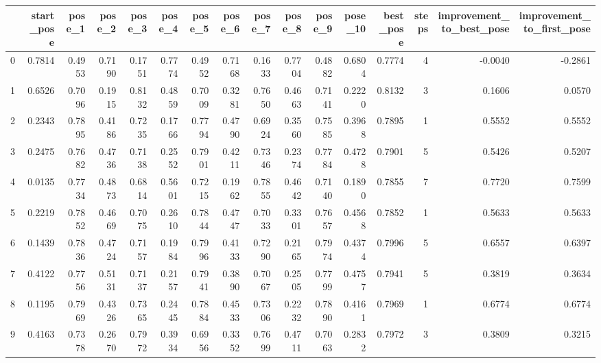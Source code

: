 \begin{tabular}{lrrrrrrrrrrrrrrr}
\toprule
{} &  start\_pose &  pose\_1 &  pose\_2 &  pose\_3 &  pose\_4 &  pose\_5 &  pose\_6 &  pose\_7 &  pose\_8 &  pose\_9 &  pose\_10 &  best\_pose &  steps &  improvement\_to\_best\_pose &  improvement\_to\_first\_pose \\
\midrule
0  &      0.7814 &  0.4953 &  0.7190 &  0.1751 &  0.7774 &  0.4952 &  0.7168 &  0.1633 &  0.7704 &  0.4882 &   0.6804 &     0.7774 &      4 &                   -0.0040 &                    -0.2861 \\
1  &      0.6526 &  0.7096 &  0.1915 &  0.8132 &  0.4859 &  0.7009 &  0.3281 &  0.7650 &  0.4663 &  0.7141 &   0.2220 &     0.8132 &      3 &                    0.1606 &                     0.0570 \\
2  &      0.2343 &  0.7895 &  0.4186 &  0.7235 &  0.1766 &  0.7794 &  0.4790 &  0.6924 &  0.3560 &  0.7585 &   0.3968 &     0.7895 &      1 &                    0.5552 &                     0.5552 \\
3  &      0.2475 &  0.7682 &  0.4736 &  0.7138 &  0.2552 &  0.7901 &  0.4211 &  0.7346 &  0.2374 &  0.7784 &   0.4728 &     0.7901 &      5 &                    0.5426 &                     0.5207 \\
4  &      0.0135 &  0.7734 &  0.4873 &  0.6814 &  0.5601 &  0.7215 &  0.1962 &  0.7855 &  0.4642 &  0.7140 &   0.1890 &     0.7855 &      7 &                    0.7720 &                     0.7599 \\
5  &      0.2219 &  0.7852 &  0.4669 &  0.7075 &  0.2610 &  0.7844 &  0.4747 &  0.7033 &  0.3301 &  0.7657 &   0.4568 &     0.7852 &      1 &                    0.5633 &                     0.5633 \\
6  &      0.1439 &  0.7836 &  0.4724 &  0.7157 &  0.1984 &  0.7996 &  0.4133 &  0.7290 &  0.2165 &  0.7974 &   0.4374 &     0.7996 &      5 &                    0.6557 &                     0.6397 \\
7  &      0.4122 &  0.7756 &  0.5131 &  0.7137 &  0.2157 &  0.7941 &  0.3890 &  0.7067 &  0.2505 &  0.7799 &   0.4757 &     0.7941 &      5 &                    0.3819 &                     0.3634 \\
8  &      0.1195 &  0.7969 &  0.4326 &  0.7365 &  0.2445 &  0.7884 &  0.4533 &  0.7306 &  0.2232 &  0.7890 &   0.4161 &     0.7969 &      1 &                    0.6774 &                     0.6774 \\
9  &      0.4163 &  0.7378 &  0.2670 &  0.7972 &  0.3934 &  0.6956 &  0.3352 &  0.7699 &  0.4711 &  0.7063 &   0.2832 &     0.7972 &      3 &                    0.3809 &                     0.3215 \\

\end{tabular}
